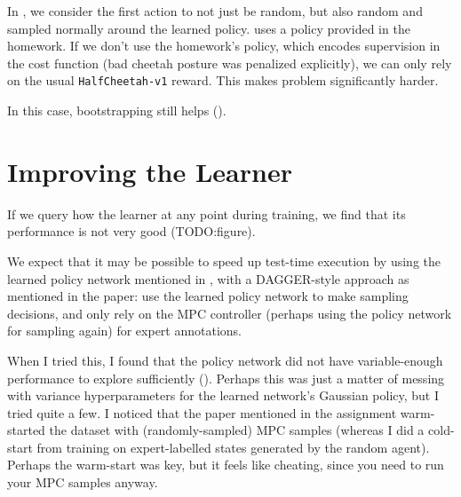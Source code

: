 \documentclass{article}
\begin{document}
In , we consider the first action to not just be random, but also random and sampled normally around the learned policy.  uses a policy provided in the homework. If we don't use the homework's policy, which encodes supervision in the cost function (bad cheetah posture was penalized explicitly), we can only rely on the usual \texttt{HalfCheetah-v1} reward. This makes problem significantly harder.

In this case, bootstrapping still helps ().


\section{Improving the Learner}

If we query how the learner at any point during training, we find that its performance is not very good (TODO:figure). 

We expect that it may be possible to speed up test-time execution by using the learned policy network mentioned in , with a DAGGER-style approach as mentioned in the paper: use the learned policy network to make sampling decisions, and only rely on the MPC controller (perhaps using the policy network for sampling again) for expert annotations.


When I tried this, I found that the policy network did not have variable-enough performance to explore sufficiently (). Perhaps this was just a matter of messing with variance hyperparameters for the learned network's Gaussian policy, but I tried quite a few. I noticed that the paper mentioned in the assignment warm-started the dataset with (randomly-sampled) MPC samples (whereas I did a cold-start from training on expert-labelled states generated by the random agent). Perhaps the warm-start was key, but it feels like cheating, since you need to run your MPC samples anyway.
\end{document}
